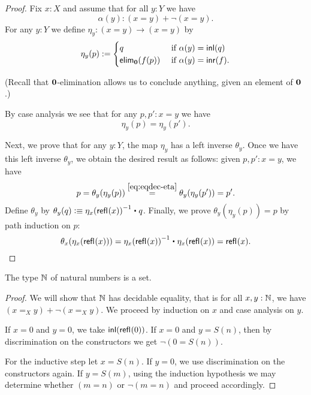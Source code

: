 \begin{proof}
Fix $x : X$ and assume that for all $y : Y$ we have
  \[\alpha(y) : (x = y) + \neg (x = y). \]
  For any $y : Y$ we define
      $  \eta_y : (x = y) \to (x = y) $
    by
    \[ \eta_y(p) := \begin{cases}
                     q & \text{ if } \alpha(y) = \mathsf{inl}(q) \\
                     \mathsf{elim}_\mathbf{0}(f(p)) & \text{ if } \alpha(y) = \mathsf{inr}(f).
                    \end{cases}
\]

(Recall that $\mathbf{0}$-elimination allows us to conclude anything, given an element of $\mathbf{0}$.)

\noindent
 By case analysis we see that for any $p, p' : x = y$ we have
 \begin{equation}\eta_y(p) = \eta_y(p') . \label{eq:eqdec-eta}\end{equation}

 \noindent
 Next, we prove that for any $y : Y$, the map $\eta_y$ has a left inverse $\theta_y$.
   Once we have this left inverse $\theta_y$, we obtain the desired result as follows: given
     $p, p' : x = y$, we have
   \[ p = \theta_y (\eta_y(p)) \stackrel{\ref{eq:eqdec-eta}}{=} \theta_y (\eta_y(p')) = p' . \]
 Define $\theta_y$ by
     $\theta_y(q) \defeq \opp{\eta_x(\refl{}(x))} \ct q$.
  Finally, we prove $\theta_y(\eta_y(p)) = p$ by path induction on $p$:
   \[\theta_x(\eta_x(\refl{}(x))) = \opp{\eta_x(\refl{}(x))} \ct \eta_x(\refl{}(x)) = \refl{}(x). \]

\end{proof}

\begin{thm}\label{prop:nat-is-set}
 The type $\mathbb{N}$ of natural numbers is a set.
\end{thm}

\begin{proof}
 We will show that $\mathbb{N}$ has decidable equality, that is for all $x, y : \mathbb{N}$, we have $(x =_X y) + \neg (x =_X y)$.
 We proceed by induction on $x$ and case analysis on $y$.

 If $x = 0$ and $y = 0$, we take $\mathsf{inl}(\mathsf{refl}_{}(0))$. If $x = 0$ and $y = S(n)$,
 then by discrimination on the constructors we get $\neg (0 = S (n))$.

 For the inductive step let $x = S (n)$. If $y = 0$, we use discrimination on the constructors again.
 If $y = S (m)$, using the induction hypothesis we may determine whether $(m = n)$ or $\neg(m = n)$ and proceed accordingly.
\end{proof}

